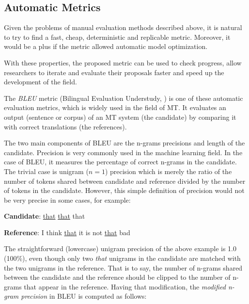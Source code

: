 
\subsection{Automatic Metrics}
\label{the-eval-auto}

Given the problems of manual evaluation methods described above, it is natural to try to find a fast, cheap, deterministic and replicable metric. Moreover, it would be a plus if the metric allowed automatic model optimization.  

With these properties, the proposed metric can be used to check progress, allow researchers to iterate and evaluate their proposals faster and speed up the development of the field.

The \textit{BLEU} metric (Bilingual Evaluation Understudy, \cite{BLEU}) is one of these automatic evaluation metrics, which is widely used in the field of MT.
It evaluates an output (sentence or corpus) of an MT system (the candidate) by comparing it with correct translations (the references).

The two main components of BLEU are the n-grams precisions and length of the candidate.
Precision is very commonly used in the machine learning field.
In the case of BLEU, it measures the percentage of correct n-grams in the candidate.
The trivial case is unigram ($n=1$) precision which is merely the ratio of the number of tokens shared between candidate and reference divided by the number of tokens in the candidate.
However, this simple definition of precision would not be very precise in some cases, for example:

\bigskip

\textbf{Candidate}: \underline{that} \underline{that} that

\textbf{Reference}: I think \underline{that} it is not \underline{that} bad

\bigskip

The straightforward (lowercase) unigram precision of the above example is 1.0 (100\%), even though only two \textit{that} unigrams in the candidate are matched with the two unigrams in the reference.
That is to say, the number of n-grams shared between the candidate and the reference should be clipped to the number of n-grams that appear in the reference. 
Having that modification, the \textit{modified n-gram precision} in BLEU is computed as follows:

